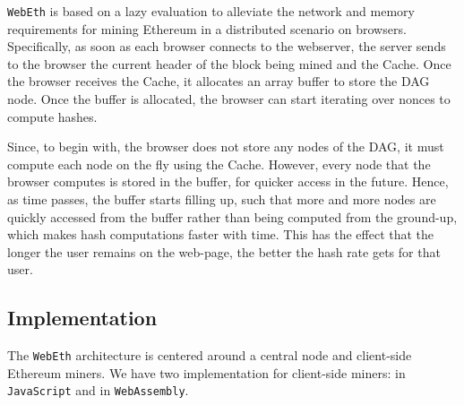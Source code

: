 \documentclass[runningheads]{llncs}
\begin{document}
\verb|WebEth| is based on a lazy evaluation to alleviate the network and memory requirements for mining Ethereum in a distributed scenario on browsers. Specifically, as soon as each browser connects to the webserver, the server sends to the browser the current header of the block being mined and the Cache. Once the browser receives the Cache, it allocates an array buffer to store the DAG node.
Once the buffer is allocated, the browser can start iterating over nonces to compute hashes.  

Since, to begin with, the browser does not store any nodes of the DAG, it must compute each node on the fly using the Cache. However, every node that the browser computes is stored in the buffer, for quicker access in the future. Hence, as time passes, the buffer starts filling up, such that more and more nodes are quickly accessed from the buffer rather than being computed from the ground-up, which makes hash computations faster with time. This has the effect that the longer the user remains on the web-page, the better the hash rate gets for that user.




\subsection{Implementation}

The \verb|WebEth| architecture is centered around a central node and client-side Ethereum miners. We have two implementation for client-side miners: in \verb|JavaScript| and in \verb|WebAssembly|. 
\end{document}
